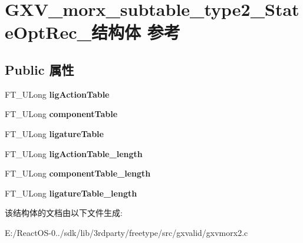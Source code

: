 \hypertarget{struct_g_x_v__morx__subtable__type2___state_opt_rec__}{}\section{G\+X\+V\+\_\+morx\+\_\+subtable\+\_\+type2\+\_\+\+State\+Opt\+Rec\+\_\+结构体 参考}
\label{struct_g_x_v__morx__subtable__type2___state_opt_rec__}
\subsection*{Public 属性}
\begin{DoxyCompactItemize}
\item 
\mbox{\label{struct_g_x_v__morx__subtable__type2___state_opt_rec___a91d6cad59d75b6820f79b4958b045437}} 
F\+T\+\_\+\+U\+Long {\bfseries lig\+Action\+Table}
\item 
\mbox{\label{struct_g_x_v__morx__subtable__type2___state_opt_rec___a02e6d9883675f63f1c337fff27edb77f}} 
F\+T\+\_\+\+U\+Long {\bfseries component\+Table}
\item 
\mbox{\label{struct_g_x_v__morx__subtable__type2___state_opt_rec___ad77c00a028fa9d2063c077d6a0d13ac5}} 
F\+T\+\_\+\+U\+Long {\bfseries ligature\+Table}
\item 
\mbox{\label{struct_g_x_v__morx__subtable__type2___state_opt_rec___a5378e0d2c388b1e5d92cfd29233fc709}} 
F\+T\+\_\+\+U\+Long {\bfseries lig\+Action\+Table\+\_\+length}
\item 
\mbox{\label{struct_g_x_v__morx__subtable__type2___state_opt_rec___a7d607cf0288bf0e1328f0452955083e3}} 
F\+T\+\_\+\+U\+Long {\bfseries component\+Table\+\_\+length}
\item 
\mbox{\label{struct_g_x_v__morx__subtable__type2___state_opt_rec___a516eaf9b6fc2798884d244928338b29c}} 
F\+T\+\_\+\+U\+Long {\bfseries ligature\+Table\+\_\+length}
\end{DoxyCompactItemize}


该结构体的文档由以下文件生成\+:\begin{DoxyCompactItemize}
\item 
E\+:/\+React\+O\+S-\/0../sdk/lib/3rdparty/freetype/src/gxvalid/gxvmorx2.\+c\end{DoxyCompactItemize}

